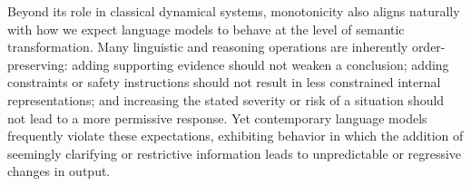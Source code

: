 \documentclass{article}
\theoremstyle{plain}
\theoremstyle{definition}
\theoremstyle{remark}
\begin{document}
Beyond its role in classical dynamical systems, monotonicity also aligns naturally with how we expect language models to behave at the level of semantic transformation. Many linguistic and reasoning operations are inherently order-preserving: adding supporting evidence should not weaken a conclusion; adding constraints or safety instructions should not result in less constrained internal representations; and increasing the stated severity or risk of a situation should not lead to a more permissive response. Yet contemporary language models frequently violate these expectations, exhibiting behavior in which the addition of seemingly clarifying or restrictive information leads to unpredictable or regressive changes in output.







\end{document}
